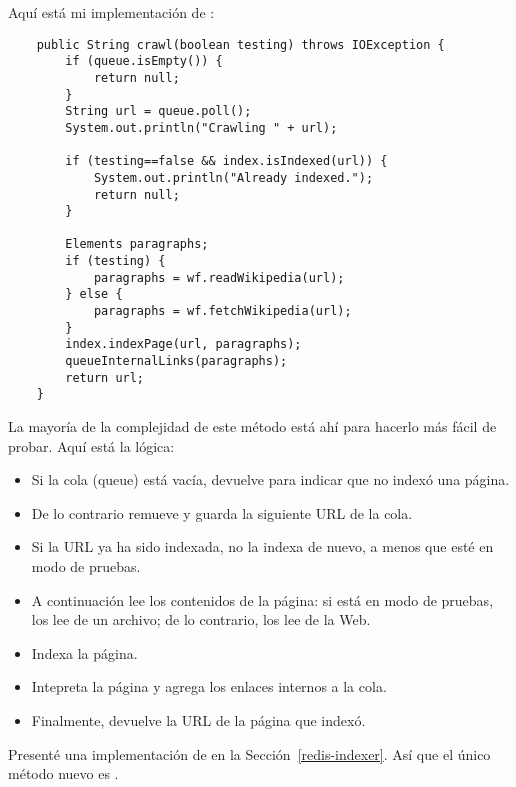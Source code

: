 \documentclass[12pt]{book}
\theoremstyle{exercise}
\begin{document}

Aquí está mi implementación de :

\begin{verbatim}
    public String crawl(boolean testing) throws IOException {
        if (queue.isEmpty()) {
            return null;
        }
        String url = queue.poll();
        System.out.println("Crawling " + url);

        if (testing==false && index.isIndexed(url)) {
            System.out.println("Already indexed.");
            return null;
        }

        Elements paragraphs;
        if (testing) {
            paragraphs = wf.readWikipedia(url);
        } else {
            paragraphs = wf.fetchWikipedia(url);
        }
        index.indexPage(url, paragraphs);
        queueInternalLinks(paragraphs);
        return url;
    }
\end{verbatim}

La mayoría de la complejidad de este método está ahí para hacerlo
más fácil de probar. Aquí está la lógica:

\begin{itemize}

\item
  Si la cola (queue) está vacía, devuelve  para indicar que
  no indexó una página.

\item
  De lo contrario remueve y guarda la siguiente URL de la cola.

\item
  Si la URL ya ha sido indexada,  no la indexa de nuevo,
  a menos que esté en modo de pruebas.

\item
  A continuación lee los contenidos de la página: si está en modo de
  pruebas, los lee de un archivo; de lo contrario, los lee de la Web.

\item
  Indexa la página.

\item
  Intepreta la página y agrega los enlaces internos a la cola.

\item
  Finalmente, devuelve la URL de la página que indexó.

\end{itemize}

Presenté una implementación de  en la
Sección~\ref{redis-indexer}. Así que el único método nuevo es
.
\end{document}
